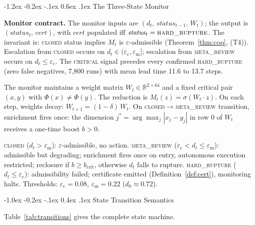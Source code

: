 \documentclass{llncs}
\makeatletter
\renewcommand\section{\@startsection{section}{1}{\z@}%
  {-1.2ex \@plus -0.2ex \@minus -.1ex}%
  {0.6ex \@plus .1ex}%
  {\normalfont\large\bfseries}}
\renewcommand\subsection{\@startsection{subsection}{2}{\z@}%
  {-1.0ex \@plus -0.2ex \@minus -.1ex}%
  {0.4ex \@plus .1ex}%
  {\normalfont\normalsize\bfseries}}
\newcommand{\ecollapse}{\varepsilon_{\mathrm{c}}}
\newcommand{\emeta}{\varepsilon_{\mathrm{m}}}
\newcommand{\st}[1]{\textup{\textsc{#1}}}
\makeatother
\begin{document}
\section{The Three-State Monitor}
\label{sec:monitor}

{\sloppy\noindent\textbf{Monitor contract.}
The monitor inputs are $(d_t,\allowbreak\, \mathit{status}_{t-1},\allowbreak\, W_t)$;
the output is $(\mathit{status}_t,\, \mathit{cert})$, with
$\mathit{cert}$ populated iff $\mathit{status}_t = \st{hard\_rupture}$.
The invariant is: \st{closed} status implies $M_t$ is
$\varepsilon$-admissible (Theorem~\ref{thm:coq}, (T4)). Escalation from
\st{closed} occurs on $d_t \in (\ecollapse, \emeta]$; escalation from
\st{meta\_review} occurs on $d_t \leq \ecollapse$. The \st{critical}
signal precedes every confirmed \st{hard\_rupture} (zero false negatives,
7,800 runs) with mean lead time 11.6 to 13.7 steps.\par}

The monitor maintains a weight matrix $W_t \in \mathbb{R}^{2 \times 64}$
and a fixed critical pair $(x, y)$ with $\Phi(x) \neq \Phi(y)$.
The reduction is $M_t(z) = \sigma(W_t \cdot z)$.
On each step, weights decay: $W_{t+1} = (1-\delta)\,W_t$.
On \st{closed}$\to$\st{meta\_review} transition, enrichment fires
once: the dimension $j^* = \arg\max_j |x_j - y_j|$ in row 0 of $W_t$
receives a one-time boost $b > 0$.

\st{closed} ($d_t > \emeta$): $\varepsilon$-admissible, no action.
\st{meta\_review} ($\ecollapse < d_t \leq \emeta$): admissible but
degrading; enrichment fires once on entry, autonomous execution
restricted; reclosure if $b \geq b_{\mathrm{crit}}$, otherwise $d_t$
falls to rupture. \st{hard\_rupture} ($d_t \leq \ecollapse$):
admissibility failed; certificate emitted (Definition~\ref{def:cert}),
monitoring halts. Thresholds: $\ecollapse = 0.08$, $\emeta = 0.22$
($d_0 \approx 0.72$).

\subsection{State Transition Semantics}

Table~\ref{tab:transitions} gives the complete state machine.
\end{document}
